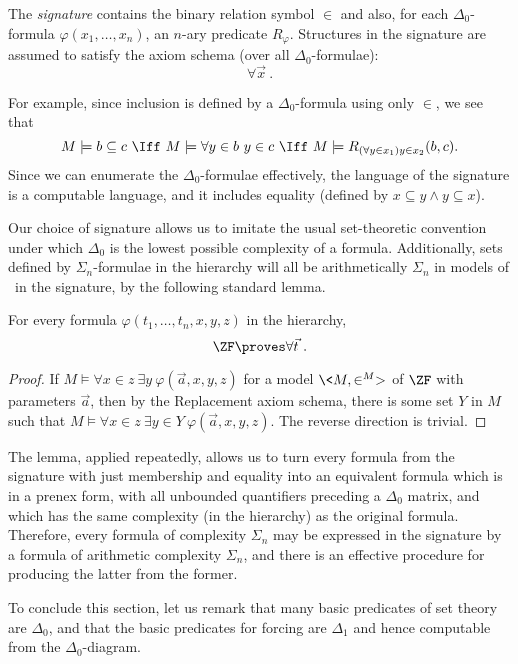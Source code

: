 \documentclass{amsart}
\begin{document}
 
 \begin{definition}\label{Definition.Levy.signature}
 The \emph{\Levy{} signature} contains the binary relation symbol $\in$ and also, for each $\Delta_0$-formula $\varphi(x_1,\ldots,x_n)$, an $n$-ary predicate $R_{\varphi}$.  Structures in the \Levy{} signature are assumed to satisfy the axiom schema (over all $\Delta_0$-formulae):
 $$ \forall \vec x\ .$$
 \end{definition}
 For example, since inclusion is defined by a $\Delta_0$-formula using only $\in$, we see that
 $$ M\models b\subseteq c \ \Iff \ M\models \forall y\in b\ y\in c
 \ \Iff \ M\models R_{(\forall y\in x_1)y\in x_2}(b,c).$$
 Since we can enumerate the $\Delta_0$-formulae effectively, the language of the \Levy{} signature is a computable language, and it includes equality (defined by $x\subseteq y \land y\subseteq x$).
 
 Our choice of signature allows us to imitate the usual set-theoretic convention under which $\Delta_0$ is the lowest possible complexity of a formula.
 Additionally, sets defined by $\Sigma_n$-formulae in the \Levy{} hierarchy will all be arithmetically $\Sigma_n$
 in models of \ZF\ in the \Levy{} signature, by the following standard lemma.
 \begin{lemma}
 \label{lemma.Levy.signature}
 For every formula $\varphi(t_1,\ldots,t_n,x,y,z)$ in the \Levy{} hierarchy,
 $$ \ZF \proves \forall\vec t\
 .$$
 \end{lemma}
 
 \begin{proof}
 If $M \models \forall x\in z\ \exists y\ \varphi(\vec a,x,y,z)$ for a model $\<M,\in^M>$ of $\ZF$ with parameters $\vec a$, then by the Replacement axiom schema, there is some set $Y$ in $M$ such that $M \models \forall x\in z\ \exists y\in Y\ \varphi(\vec a,x,y,z)$.  The reverse direction is trivial.
 \end{proof}
 
 The lemma, applied repeatedly, allows us to turn every formula from the signature with just membership and equality into an equivalent formula which is in a prenex form, with all unbounded quantifiers preceding a $\Delta_0$ matrix, and which has the same complexity (in the \Levy{} hierarchy) as the original formula. Therefore, every formula of \Levy{} complexity $\Sigma_n$ may be expressed in the \Levy{} signature by a formula of arithmetic complexity $\Sigma_n$, and there is an effective procedure for producing the latter from the former.
 
 To conclude this section, let us remark that many basic predicates of set theory are $\Delta_0$, and that the basic predicates for forcing are $\Delta_1$ and hence computable from the $\Delta_0$-diagram.
 
\end{document}
